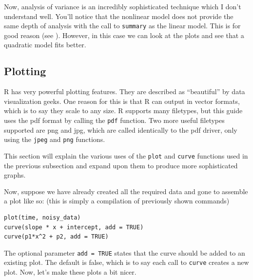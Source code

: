\documentclass[12pt]{article}
\begin{document}

Now, analysis of variance is an incredibly sophisticated technique which I don't understand well. You'll notice that the nonlinear model does not provide the same depth of analysis with the call to \verb|summary| as the linear model. This is for good reason (see \cite{nlsanova}). However, in this case we can look at the plots and see that a quadratic model fits better.

\subsection{Plotting}
R has very powerful plotting features. They are described as ``beautiful'' by data visualization geeks. One reason for this is that R can output in vector formats, which is to say they scale to any size. R supports many filetypes, but this guide uses the pdf format by calling the \verb|pdf| function. Two more useful filetypes supported are png and jpg, which are called identically to the pdf driver, only using the \verb|jpeg| and \verb|png| functions.

This section will explain the various uses of the \verb|plot| and \verb|curve| functions used in the previous subsection and expand upon them to produce more sophisticated graphs.

Now, suppose we have already created all the required data and gone to assemble a plot like so: (this is simply a compilation of previously shown commands)
\begin{Verbatim}[frame=single, fontsize=\small]
plot(time, noisy_data)
curve(slope * x + intercept, add = TRUE)
curve(p1*x^2 + p2, add = TRUE)
\end{Verbatim}

The optional parameter \verb|add = TRUE| states that the curve should be added to an existing plot. The default is false, which is to say each call to \verb|curve| creates a new plot. Now, let's make these plots a bit nicer.
\end{document}
